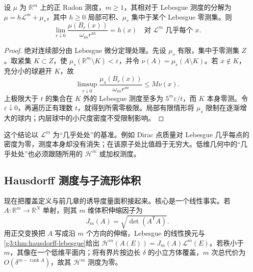 \begin{proposition}\label{g3:prop:radon-lebesgue-density}
	设 \(\mu\) 为 \(\mathbb R^m\) 上的正 Radon 测度，\(m\ge1\)，其相对于 Lebesgue 测度的分解为
	\(\mu=h\mathcal L^m+\mu_s\)，其中 \(h\ge0\) 局部可积、\(\mu_s\) 集中于某个 Lebesgue 零测集。则
	\[
		\lim_{r\downarrow0}\frac{\mu(B_r(x))}{\omega_mr^m}=h(x)
		\quad\text{对 }\mathcal L^m\text{ 几乎每个 }x.
	\]
\end{proposition}
\begin{proof}
	绝对连续部分由 Lebesgue 微分定理处理。先设 \(\mu_s\) 有限，集中于零测集 \(Z\)。取紧集 \(K\subset Z\)，使 \(\mu_s(\mathbb R^m\setminus K)<\varepsilon\)，并令 \(\nu(A)=\mu_s(A\setminus K)\)。若 \(x\notin K\)，充分小的球避开 \(K\)，故
	\[
		\limsup_{r\downarrow0}\frac{\mu_s(B_r(x))}{\omega_mr^m}
		\le M\nu(x).
	\]
	上极限大于 \(t\) 的集合在 \(K\) 外的 Lebesgue 测度至多为 \(5^m\varepsilon/t\)，而 \(K\) 本身零测。令 \(\varepsilon\downarrow0\)，再遍历正有理数 \(t\)，就得到所需零极限。局部有限情形将 \(\mu_s\) 限制在逐渐增大的球内；内层球中的小尺度密度不受限制影响。
\end{proof}

这个结论以 \(\mathcal L^m\) 为“几乎处处”的基准。例如 Dirac 点质量对 Lebesgue 几乎每点的密度为零，测度本身却没有消失；在该原子处比值趋于无穷大。低维几何中的“几乎处处”也必须跟随所用的 \(\mathcal H^m\) 或加权测度。

\subsection{Hausdorff 测度与子流形体积}
\label{g3:subsec:2001:04}
现在把覆盖定义与前几章的诱导度量面积接起来。核心是一个线性事实。若 \(A:\mathbb R^m\to\mathbb R^N\) 单射，则其 \(m\) 维体积伸缩因子为
\[
	J_m(A)=\sqrt{\det(A^{\mathsf T}A)}.
\]
用正交变换把 \(A\) 写成沿 \(m\) 个方向的伸缩，Lebesgue 的线性换元与\cref{g3:thm:hausdorff-lebesgue}给出
\(\mathcal H^m(A(E))=J_m(A)\mathcal L^m(E)\)。若秩小于 \(m\)，其像在一个低维平面内；将有界片按边长 \(\delta\) 的小立方体覆盖，\(m\) 次总代价为 \(O(\delta^{m-\operatorname{rank}A})\)，故其 \(\mathcal H^m\) 测度为零。

